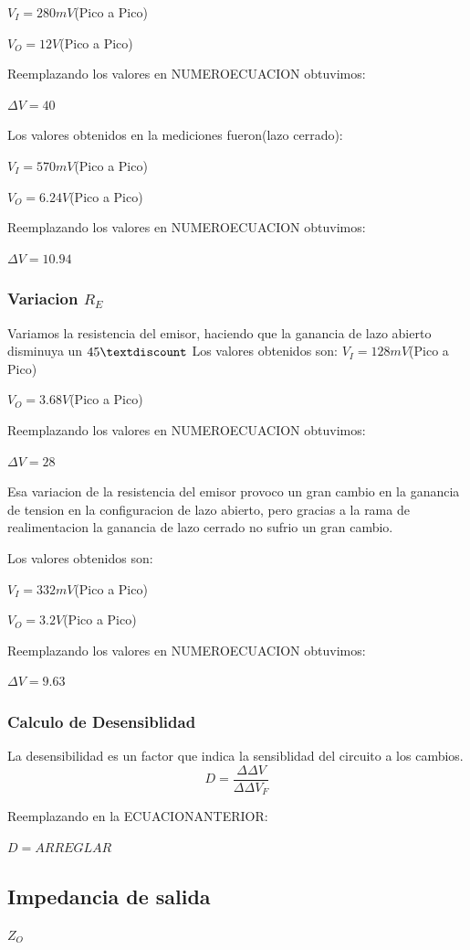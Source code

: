 \documentclass[12pt]{article}
\begin{document}
$V_I=280 mV$(Pico a Pico)

$V_O=12 V$(Pico a Pico)

Reemplazando los valores en  NUMEROECUACION obtuvimos: 

$\Delta V=40$

Los valores obtenidos en la mediciones fueron(lazo cerrado):

$V_I=570 mV$(Pico a Pico)

$V_O=6.24 V$(Pico a Pico)

Reemplazando los valores en  NUMEROECUACION obtuvimos: 

$\Delta V=10.94$

\subsubsection{Variacion $R_E$}
Variamos la resistencia del emisor, haciendo que la ganancia de lazo abierto disminuya un $45\textdiscount$
Los valores obtenidos son:
$V_I=128 mV$(Pico a Pico)

$V_O=3.68 V$(Pico a Pico)

Reemplazando los valores en  NUMEROECUACION obtuvimos: 

$\Delta V=28$

Esa variacion de la resistencia del emisor provoco un gran cambio en la ganancia de tension en la configuracion de lazo abierto,
pero gracias a la rama de realimentacion la ganancia de lazo cerrado no sufrio un gran cambio.

Los valores obtenidos son:

$V_I=332 mV$(Pico a Pico)

$V_O=3.2 V$(Pico a Pico)

Reemplazando los valores en  NUMEROECUACION obtuvimos: 

$\Delta V=9.63$

\subsubsection{Calculo de Desensiblidad}
La desensibilidad es un factor que indica la sensiblidad del circuito a los cambios.
\begin{equation}
 D = \frac{\Delta \Delta V}{\Delta \Delta V_F}
\end{equation}

Reemplazando en la ECUACIONANTERIOR:

$D= ARREGLAR$


\subsection{Impedancia de salida }
$ Z_O$
\end{document}
